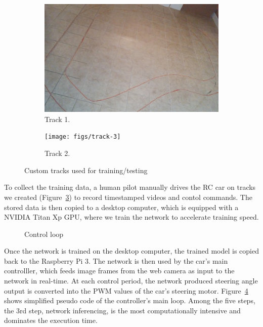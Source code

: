 \begin{figure}[h]
  \centering
  \begin{subfigure}{0.4\textwidth}
    \includegraphics[width=\textwidth]{figs/track-2}
    \caption{Track 1.}
    \label{fig:track}
  \end{subfigure}
  \hfill
  \begin{subfigure}{0.4\textwidth}
    \texttt{[image: figs/track-3]}
    \caption{Track 2.}
    \label{fig:track2}
  \end{subfigure}
  \caption{Custom tracks used for training/testing}
  \label{fig:tracks}
\end{figure}

To collect the training data, a human pilot manually drives the RC car
on tracks we created (Figure~\ref{fig:tracks}) to record
timestamped videos and contol commands. The stored data is then copied 
to a desktop computer, which is equipped with a NVIDIA Titan Xp GPU, 
where we train the network to accelerate training speed.


\begin{figure}[h]
  
  \caption{Control loop}
  \label{fig:controlloop}
\end{figure}

Once the network is trained on the desktop computer, the trained model
is copied back to the Raspberry Pi 3. The network is then used
by the car's main controlller, which feeds image frames from the web
camera as input to the network in real-time. At each control period,
the network produced steering angle output is converted into the PWM values
of the car's steering motor. Figure~\ref{fig:controlloop} shows simplified 
pseudo code of the controller's main loop. Among the five steps, the 3rd step, 
network inferencing, is the most computationally intensive and dominates the
execution time.


